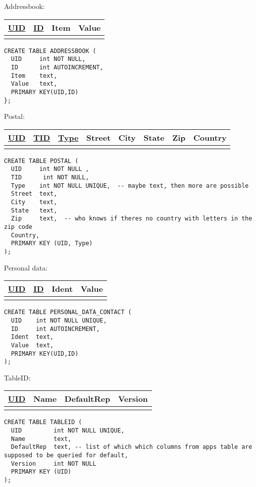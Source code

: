 \noindent
Addressbook: \\
\begin{tabular}[ht]{|l|l|l|l|}
\hline
\underline{UID} & \underline{ID} & Item & Value\\
\hline
 & & & \\
\hline
\end{tabular}

\begin{verbatim}
CREATE TABLE ADDRESSBOOK (
  UID     int NOT NULL,
  ID      int AUTOINCREMENT,
  Item    text,
  Value   text,
  PRIMARY KEY(UID,ID)
};
\end{verbatim} 
 

\noindent
Postal:\\
\begin{tabular}[ht]{|l|l|l|l|l|l|l|l|}
\hline
\underline{UID} & \underline{TID} & \underline{Type} & Street & City & State & Zip & Country  \\
\hline
 & & & & & & &\\
\hline
\end{tabular}
\begin{verbatim}
CREATE TABLE POSTAL (
  UID     int NOT NULL ,
  TID      int NOT NULL,
  Type    int NOT NULL UNIQUE,  -- maybe text, then more are possible
  Street  text,
  City    text,
  State   text,
  Zip     text,  -- who knows if theres no country with letters in the zip code
  Country,
  PRIMARY KEY (UID, Type)
);
\end{verbatim}
 

\noindent
Personal data: \\
\begin{tabular}[ht]{|l|l|l|l|}
\hline
\underline{UID} & \underline{ID} & Ident & Value \\
\hline
 & & & \\
\hline
\end{tabular}
\begin{verbatim}
CREATE TABLE PERSONAL_DATA_CONTACT (
  UID    int NOT NULL UNIQUE,
  ID     int AUTOINCREMENT,
  Ident  text,
  Value  text,
  PRIMARY KEY(UID,ID)
);      
\end{verbatim}

\noindent
TableID: \\
\begin{tabular}[ht]{|l|l|l|l|}
\hline
\underline{UID} & Name & DefaultRep & Version\\
\hline
 & & &\\
\hline
\end{tabular}
\begin{verbatim}
CREATE TABLE TABLEID (
  UID         int NOT NULL UNIQUE,
  Name        text,
  DefaultRep  text, -- list of which which columns from apps table are supposed to be queried for default,
  Version     int NOT NULL 
  PRIMARY KEY (UID)
);
\end{verbatim}



